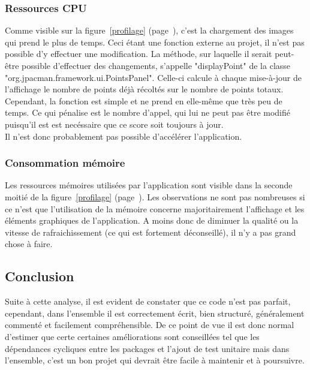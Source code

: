 \documentclass[12pt,a4paper,final]{article}
\newcommand{\labelfigure}[1]{figure~\ref{#1} (page~\pageref{#1})}
\begin{document}
\subsubsection{Ressources CPU}
Comme visible sur la \labelfigure{profilage}, c'est la chargement des images qui prend le plus de temps. Ceci étant une fonction externe au projet, il n'est pas possible d'y effectuer une modification. La méthode, sur laquelle il serait peut-être possible d'effectuer des changements, s'appelle "displayPoint" de la classe "org.jpacman.framework.ui.PointsPanel". Celle-ci calcule à chaque mise-à-jour de l'affichage le nombre de points déjà récoltés sur le nombre de points totaux. Cependant, la fonction est simple et ne prend en elle-même que très peu de temps. Ce qui pénalise est le nombre d'appel, qui lui ne peut pas être modifié puisqu'il est est necéssaire que ce score soit toujours à jour. \\
Il n'est donc probablement pas possible d'accélérer l'application.

\subsubsection{Consommation mémoire}
Les ressources mémoires utilisées par l'application sont visible dans la seconde moitié de la \labelfigure{profilage}. Les observations ne sont pas nombreuses si ce n'est que l'utilisation de la mémoire concerne majoritairement l'affichage et les éléments graphiques de l'application. A moins donc de diminuer la qualité ou la vitesse de rafraichissement (ce qui est fortement déconseillé), il n'y a pas grand chose à faire.


\subsection{Conclusion}
Suite à cette analyse, il est evident de constater que ce code n'est pas parfait, cependant, dans l'ensemble il est correctement écrit, bien structuré, généralement commenté et facilement compréhensible. De ce point de vue il est donc normal d'estimer que certe certaines améliorations sont conseillées tel que les dépendances cycliques entre les packages et l'ajout de test unitaire mais dans l'ensemble, c'est un bon projet qui devrait être facile à maintenir et à poursuivre.

\newpage
\clearpage
\end{document}

